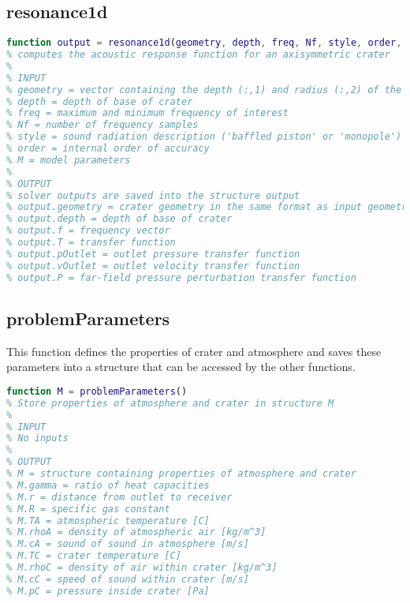 \documentclass[10pt]{article}
\begin{document}
\subsection{resonance1d}
\begin{lstlisting}[language=Matlab]
function output = resonance1d(geometry, depth, freq, Nf, style, order, M)
% computes the acoustic response function for an axisymmetric crater
%
% INPUT
% geometry = vector containing the depth (:,1) and radius (:,2) of the crater starting from the deepest depth
% depth = depth of base of crater
% freq = maximum and minimum frequency of interest
% Nf = number of frequency samples
% style = sound radiation description ('baffled piston' or 'monopole')
% order = internal order of accuracy
% M = model parameters
%
% OUTPUT
% solver outputs are saved into the structure output
% output.geometry = crater geometry in the same format as input geometry
% output.depth = depth of base of crater
% output.f = frequency vector
% output.T = transfer function
% output.pOutlet = outlet pressure transfer function
% output.vOutlet = outlet velocity transfer function
% output.P = far-field pressure perturbation transfer function
\end{lstlisting}

\subsection{problemParameters}
This function defines the properties of crater and atmosphere and saves these parameters into a structure that can be accessed by the other functions. 

\begin{lstlisting}[language=Matlab]
function M = problemParameters()
% Store properties of atmosphere and crater in structure M
%
% INPUT
% No inputs
%
% OUTPUT
% M = structure containing properties of atmosphere and crater
% M.gamma = ratio of heat capacities
% M.r = distance from outlet to receiver
% M.R = specific gas constant
% M.TA = atmospheric temperature [C]
% M.rhoA = density of atmospheric air [kg/m^3]
% M.cA = sound of sound in atmosphere [m/s]
% M.TC = crater temperature [C]
% M.rhoC = density of air within crater [kg/m^3]
% M.cC = speed of sound within crater [m/s]
% M.pC = pressure inside crater [Pa]
\end{lstlisting}
\end{document}
